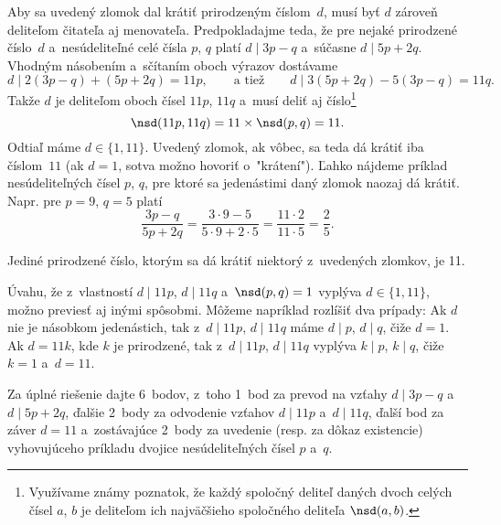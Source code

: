 {%
Aby sa uvedený zlomok dal krátiť prirodzeným číslom~$d$, musí byť $d$ zároveň deliteľom čitateľa aj menovateľa. Predpokladajme teda, že pre nejaké prirodzené číslo~$d$ a~nesúdeliteľné celé čísla $p$, $q$ platí $d\mid 3p-q$ a~súčasne $d\mid 5p+2q$. Vhodným násobením a~sčítaním oboch výrazov dostávame
$$
d\mid 2(3p-q)+(5p+2q)=11p,\qquad\text{a tiež}\qquad d\mid 3(5p+2q)-5(3p-q)=11q.
$$
Takže $d$ je deliteľom oboch čísel $11p$, $11q$ a~musí deliť aj číslo\footnote{Využívame známy poznatok, že každý spoločný deliteľ daných dvoch celých čísel $a$, $b$ je deliteľom ich najväčšieho spoločného deliteľa $\nsd(a,b)$.}
$$
\nsd(11p,11q)=11\cdot\nsd(p,q)=11.
$$
Odtiaľ máme $d\in\{1,11\}$. Uvedený zlomok, ak vôbec, sa teda dá krátiť iba číslom~$11$ (ak $d=1$, sotva možno hovoriť o~"krátení"). Ľahko nájdeme príklad nesúdeliteľných čísel $p$, $q$, pre ktoré sa jedenástimi daný zlomok naozaj dá krátiť. Napr. pre $p=9$, $q=5$ platí
$$
\frac{3p-q}{5p+2q}=\frac{3\cdot9-5}{5\cdot9+2\cdot5}=\frac{11\cdot2}{11\cdot5}=\frac{2}{5}.
$$

\odpoved
Jediné prirodzené číslo, ktorým sa dá krátiť niektorý z~uvedených zlomkov, je 11.

\poznamka
Úvahu, že z~vlastností $d\mid 11p$, $d\mid 11q$ a~$\nsd(p,q)=1$ vyplýva $d\in\{1,11\}$, možno previesť aj inými spôsobmi. Môžeme napríklad rozlíšiť dva prípady: Ak $d$ nie je násobkom jedenástich, tak z~$d\mid 11p$, $d\mid 11q$ máme $d\mid p$, $d\mid q$, čiže $d=1$. Ak $d=11k$, kde $k$ je prirodzené, tak z~$d\mid 11p$, $d\mid 11q$ vyplýva $k\mid p$, $k\mid q$, čiže $k=1$ a~$d=11$.

\nobreak\medskip\petit\noindent
Za úplné riešenie dajte 6~bodov, z~toho 1~bod za prevod na vzťahy $d\mid 3p-q$ a~$d\mid 5p+2q$, ďalšie 2~body za odvodenie vzťahov $d\mid 11p$ a~$d\mid 11q$, ďalší bod za záver $d=11$ a~zostávajúce 2~body za uvedenie (resp. za dôkaz existencie) vyhovujúceho príkladu dvojice nesúdeliteľných čísel $p$ a~$q$.
\endpetit
\bigbreak}

